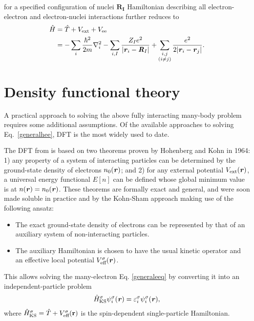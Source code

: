 %
for a specified configuration of nuclei $\mathbf{R_I}$ Hamiltonian describing all
electron-electron and electron-nuclei interactions further reduces to
%
\begin{equation}\label{generalhee2}
\begin{aligned}
\hat{H}&=\hat{T}+V_\text{ext}+V_\text{ee} \\
&=-\sum_i\frac{\hbar^2}{2m}\nabla_i^2-
\sum_{i,I}\frac{Z_Ie^2}{|\textbf{\textit r}_i-\textbf{\textit R}_I|}+
\sum_{\substack{i,j\\(i\neq j)}}\frac{e^2}{2|\textbf{\textit r}_i-\textbf{\textit r}_j|}.
\end{aligned}
\end{equation}

\section{Density functional theory}\label{ksdft}

A practical approach to solving the above fully interacting many-body problem
requires some additional assumptions. Of the available approaches to solving
Eq.~\ref{generalhee}, DFT is the most widely used to date. 

The DFT from is based on two theorems proven by Hohenberg and Kohn \cite{Hohenberg1964} in
1964: 1) any property of a system of interacting particles can be determined by the
ground-state density of electrons $n_0(\textbf{\textit r})$; and 2) for any external
potential $V_\text{ext}(\textbf{\textit r})$, a universal energy functional $E[n]$
can be defined whose global minimum value is at $n(\textbf{\textit
r})=n_0(\textbf{\textit r})$. These theorems are formally exact and general, and were
soon made soluble in practice and by the Kohn-Sham approach \cite{Kohn1965} making use
of the following ansatz:
%
\begin{itemize}
\item The exact ground-state density of electrons can be represented by that of an auxiliary system of non-interacting particles.
\item The auxiliary Hamiltonian is chosen to have the usual kinetic operator and an effective local potential $V_\text{eff}^\sigma(\textbf{\textit r})$.
\end{itemize}
This allows solving the many-electron Eq. \ref{generaleeq} by converting it into an independent-particle problem 
\begin{equation}\label{kseq}
\begin{aligned}
\hat{H}_\text{KS}^\sigma\psi_i^\sigma(\textbf{\textit r})=\varepsilon_i^\sigma\psi_i^\sigma(\textbf{\textit r}), 
\end{aligned}
\end{equation}
where $\hat{H}_\text{KS}^\sigma=\hat{T}+V_\text{eff}^\sigma(\textbf r)$ is the spin-dependent single-particle Hamiltonian.

